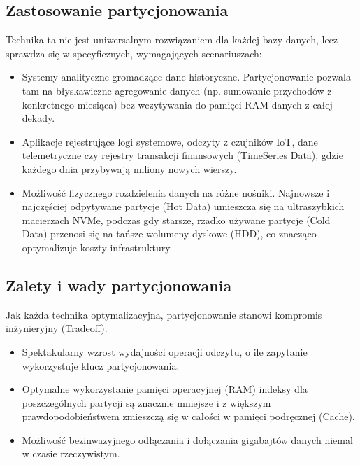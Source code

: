 \documentclass[a4paper,11pt,english,openany,oneside]{sphinxmanual}
\begin{document}
\subsection{Zastosowanie partycjonowania}
\label{\detokenize{rozdzial_2/rozdzial_26/index:zastosowanie-partycjonowania}}
\sphinxAtStartPar
Technika ta nie jest uniwersalnym rozwiązaniem dla każdej bazy danych, lecz sprawdza się w specyficznych, wymagających scenariuszach:
\begin{itemize}
\item {} 
\sphinxAtStartPar
{} Systemy analityczne gromadzące dane historyczne. Partycjonowanie pozwala tam na błyskawiczne agregowanie danych (np. sumowanie przychodów z konkretnego miesiąca) bez wczytywania do pamięci RAM danych z całej dekady.

\item {} 
\sphinxAtStartPar
{} Aplikacje rejestrujące logi systemowe, odczyty z czujników IoT, dane telemetryczne czy rejestry transakcji finansowych (Time\sphinxhyphen{}Series Data), gdzie każdego dnia przybywają miliony nowych wierszy.

\item {} 
\sphinxAtStartPar
{} Możliwość fizycznego rozdzielenia danych na różne nośniki. Najnowsze i najczęściej odpytywane partycje (Hot Data) umieszcza się na ultra\sphinxhyphen{}szybkich macierzach NVMe, podczas gdy starsze, rzadko używane partycje (Cold Data) przenosi się na tańsze wolumeny dyskowe (HDD), co znacząco optymalizuje koszty infrastruktury.

\end{itemize}


\subsection{Zalety i wady partycjonowania}
\label{\detokenize{rozdzial_2/rozdzial_26/index:zalety-i-wady-partycjonowania}}
\sphinxAtStartPar
Jak każda technika optymalizacyjna, partycjonowanie stanowi kompromis inżynieryjny (Trade\sphinxhyphen{}off).

\sphinxAtStartPar
{}
\begin{itemize}
\item {} 
\sphinxAtStartPar
Spektakularny wzrost wydajności operacji odczytu, o ile zapytanie wykorzystuje klucz partycjonowania.

\item {} 
\sphinxAtStartPar
Optymalne wykorzystanie pamięci operacyjnej (RAM) \textendash{} indeksy dla poszczególnych partycji są znacznie mniejsze i z większym prawdopodobieństwem zmieszczą się w całości w pamięci podręcznej (Cache).

\item {} 
\sphinxAtStartPar
Możliwość bezinwazyjnego odłączania i dołączania gigabajtów danych niemal w czasie rzeczywistym.

\end{itemize}
\end{document}
